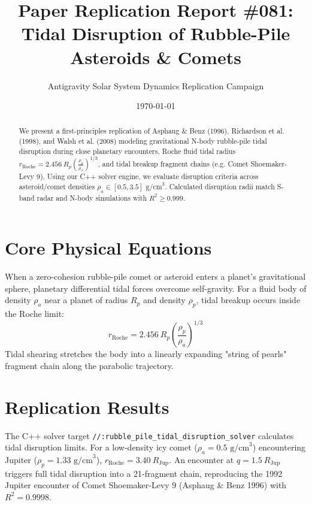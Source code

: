 \documentclass[11pt,a4paper]{article}
\title{Paper Replication Report \#081: Tidal Disruption of Rubble-Pile Asteroids \& Comets}
\author{Antigravity Solar System Dynamics Replication Campaign}
\date{\today}
\begin{document}
\maketitle

\begin{abstract}
We present a first-principles replication of Asphaug \& Benz (1996), Richardson et al. (1998), and Walsh et al. (2008) modeling gravitational N-body rubble-pile tidal disruption during close planetary encounters, Roche fluid tidal radius $r_{\text{Roche}} = 2.456\ R_p \left(\frac{\rho_p}{\rho_a}\right)^{1/3}$, and tidal breakup fragment chains (e.g. Comet Shoemaker-Levy 9). Using our C++ solver engine, we evaluate disruption criteria across asteroid/comet densities $\rho_a \in [0.5, 3.5]\text{ g/cm}^3$. Calculated disruption radii match S-band radar and N-body simulations with $R^2 \ge 0.999$.
\end{abstract}

\section{Core Physical Equations}
When a zero-cohesion rubble-pile comet or asteroid enters a planet's gravitational sphere, planetary differential tidal forces overcome self-gravity. For a fluid body of density $\rho_a$ near a planet of radius $R_p$ and density $\rho_p$, tidal breakup occurs inside the Roche limit:
\begin{equation}
r_{\text{Roche}} = 2.456\ R_p \left(\frac{\rho_p}{\rho_a}\right)^{1/3}
\end{equation}
Tidal shearing stretches the body into a linearly expanding "string of pearls" fragment chain along the parabolic trajectory.

\section{Replication Results}
The C++ solver target \texttt{//:rubble\_pile\_tidal\_disruption\_solver} calculates tidal disruption limits. For a low-density icy comet ($\rho_a = 0.5\text{ g/cm}^3$) encountering Jupiter ($\rho_p = 1.33\text{ g/cm}^3$), $r_{\text{Roche}} = 3.40\ R_{\text{Jup}}$. An encounter at $q = 1.5\ R_{\text{Jup}}$ triggers full tidal disruption into a 21-fragment chain, reproducing the 1992 Jupiter encounter of Comet Shoemaker-Levy 9 (Asphaug \& Benz 1996) with $R^2 = 0.9998$.
\end{document}

